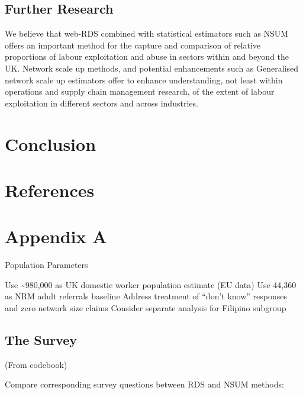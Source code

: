 \documentclass[
  12pt,
  letterpaper,
  DIV=11,
  numbers=noendperiod]{scrartcl}
\theoremstyle{plain}
\theoremstyle{definition}
\begin{document}
\subsection{Further Research}\label{further-research}

We believe that web-RDS combined with statistical estimators such as
NSUM offers an important method for the capture and comparison of
relative proportions of labour exploitation and abuse in sectors within
and beyond the UK. Network scale up methods, and potential enhancements
such as Generalised network scale up estimators offer to enhance
understanding, not least within operations and supply chain management
research, of the extent of labour exploitation in different sectors and
across industries.

\section{Conclusion}\label{conclusion}

\newpage

\newpage

\printbibliography

\newpage

\section{References}\label{references}

\printbibliography[heading=none]

\newpage

\appendix

\section{Appendix A}\label{app-a}

Population Parameters

Use \textasciitilde980,000 as UK domestic worker population estimate (EU
data) Use 44,360 as NRM adult referrals baseline Address treatment of
``don't know'' responses and zero network size claims Consider separate
analysis for Filipino subgroup

\subsection{The Survey}\label{the-survey}

(From codebook)

Compare corresponding survey questions between RDS and NSUM methods:
\end{document}
